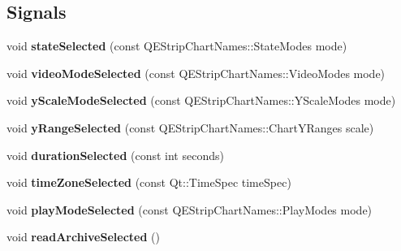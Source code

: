 \subsection*{Signals}
\begin{DoxyCompactItemize}
\item 
\hypertarget{classQEStripChartToolBar_a25f70d5c2429ef8d6b9bdab181fc365c}{
void {\bfseries stateSelected} (const QEStripChartNames::StateModes mode)}
\label{classQEStripChartToolBar_a25f70d5c2429ef8d6b9bdab181fc365c}

\item 
\hypertarget{classQEStripChartToolBar_a7429446aaa355369e98128357ea53ba6}{
void {\bfseries videoModeSelected} (const QEStripChartNames::VideoModes mode)}
\label{classQEStripChartToolBar_a7429446aaa355369e98128357ea53ba6}

\item 
\hypertarget{classQEStripChartToolBar_a4ab61662637fa8be2cb01e6fa0439508}{
void {\bfseries yScaleModeSelected} (const QEStripChartNames::YScaleModes mode)}
\label{classQEStripChartToolBar_a4ab61662637fa8be2cb01e6fa0439508}

\item 
\hypertarget{classQEStripChartToolBar_a2c984255efb8665d06c9e1f7e63163a6}{
void {\bfseries yRangeSelected} (const QEStripChartNames::ChartYRanges scale)}
\label{classQEStripChartToolBar_a2c984255efb8665d06c9e1f7e63163a6}

\item 
\hypertarget{classQEStripChartToolBar_a3c877f266c16fde0ef71d14775e102d5}{
void {\bfseries durationSelected} (const int seconds)}
\label{classQEStripChartToolBar_a3c877f266c16fde0ef71d14775e102d5}

\item 
\hypertarget{classQEStripChartToolBar_ac6026311c6df325c346960fd2f447e23}{
void {\bfseries timeZoneSelected} (const Qt::TimeSpec timeSpec)}
\label{classQEStripChartToolBar_ac6026311c6df325c346960fd2f447e23}

\item 
\hypertarget{classQEStripChartToolBar_a433fcd8fe52cb579f2be229a4898d88f}{
void {\bfseries playModeSelected} (const QEStripChartNames::PlayModes mode)}
\label{classQEStripChartToolBar_a433fcd8fe52cb579f2be229a4898d88f}

\item 
\hypertarget{classQEStripChartToolBar_adce7db21dd71c555ad4b7f15925c4f5a}{
void {\bfseries readArchiveSelected} ()}
\label{classQEStripChartToolBar_adce7db21dd71c555ad4b7f15925c4f5a}

\end{DoxyCompactItemize}
